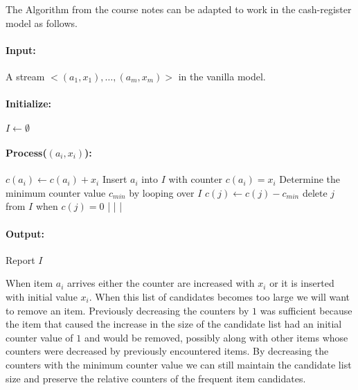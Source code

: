 The Algorithm from the course notes can be adapted to work in the cash-register model as follows.

\paragraph{Input:} 
	A stream $<(a_1, x_1), \ldots , (a_m, x_m)>$ in the vanilla model.
\paragraph{Initialize:}
	$I \leftarrow \emptyset$
\paragraph{Process($(a_i, x_i)$):}
\begin{minipage}[t]{\textwidth}
\begin{sourcecode} 
	$c(a_i) \leftarrow c(a_i) + x_i$
\qelse
	Insert $a_i$ into $I$ with counter $c(a_i) = x_i$
		Determine the minimum counter value $c_{\textit{min}}$ by looping over $I$
			$c(j) \leftarrow c(j) - c_{\textit{min}}$
			delete $j$ from $I$ when $c(j) = 0$ 
		|
	|			
|
\end{sourcecode}
\end{minipage}
\paragraph{Output:}
	Report $I$

When item $a_i$ arrives either the counter are increased with $x_i$ or it is inserted with initial value $x_i$. When this list of candidates becomes too large we will want to remove an item. Previously decreasing the counters by $1$ was sufficient because the item that caused the increase in the size of the candidate list had an initial counter value of $1$ and would be removed, possibly along with other items whose counters were decreased by previously encountered items. By decreasing the counters with the minimum counter value we can still maintain the candidate list size and preserve the relative counters of the frequent item candidates.
